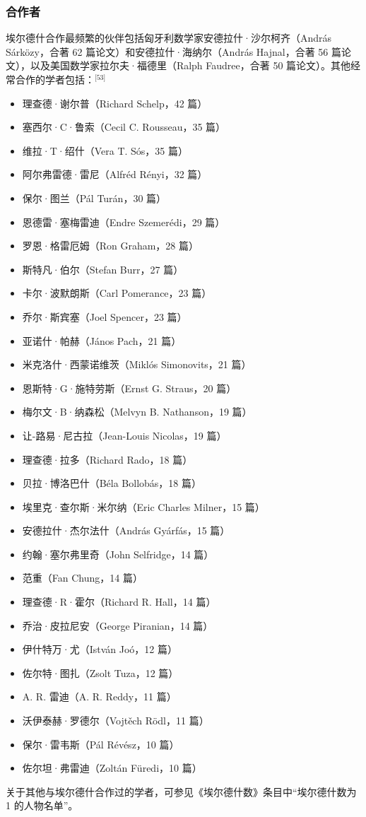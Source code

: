 \subsubsection{合作者}
埃尔德什合作最频繁的伙伴包括匈牙利数学家安德拉什·沙尔柯齐（András Sárközy，合著 62 篇论文）和安德拉什·海纳尔（András Hajnal，合著 56 篇论文），以及美国数学家拉尔夫·福德里（Ralph Faudree，合著 50 篇论文）。其他经常合作的学者包括：\(^\text{[53]}\)
\begin{itemize}
\item 理查德·谢尔普（Richard Schelp，42 篇）
\item 塞西尔·C·鲁索（Cecil C. Rousseau，35 篇）
\item 维拉·T·绍什（Vera T. Sós，35 篇）
\item 阿尔弗雷德·雷尼（Alfréd Rényi，32 篇）
\item 保尔·图兰（Pál Turán，30 篇）
\item 恩德雷·塞梅雷迪（Endre Szemerédi，29 篇）
\item 罗恩·格雷厄姆（Ron Graham，28 篇）
\item 斯特凡·伯尔（Stefan Burr，27 篇）
\item 卡尔·波默朗斯（Carl Pomerance，23 篇）
\item 乔尔·斯宾塞（Joel Spencer，23 篇）
\item 亚诺什·帕赫（János Pach，21 篇）
\item 米克洛什·西蒙诺维茨（Miklós Simonovits，21 篇）
\item 恩斯特·G·施特劳斯（Ernst G. Straus，20 篇）
\item 梅尔文·B·纳森松（Melvyn B. Nathanson，19 篇）
\item 让-路易·尼古拉（Jean-Louis Nicolas，19 篇）
\item 理查德·拉多（Richard Rado，18 篇）
\item 贝拉·博洛巴什（Béla Bollobás，18 篇）
\item 埃里克·查尔斯·米尔纳（Eric Charles Milner，15 篇）
\item 安德拉什·杰尔法什（András Gyárfás，15 篇）
\item 约翰·塞尔弗里奇（John Selfridge，14 篇）
\item 范重（Fan Chung，14 篇）
\item 理查德·R·霍尔（Richard R. Hall，14 篇）
\item 乔治·皮拉尼安（George Piranian，14 篇）
\item 伊什特万·尤（István Joó，12 篇）
\item 佐尔特·图扎（Zsolt Tuza，12 篇）
\item A. R. 雷迪（A. R. Reddy，11 篇）
\item 沃伊泰赫·罗德尔（Vojtěch Rödl，11 篇）
\item 保尔·雷韦斯（Pál Révész，10 篇）
\item 佐尔坦·弗雷迪（Zoltán Füredi，10 篇）
\end{itemize}
关于其他与埃尔德什合作过的学者，可参见《埃尔德什数》条目中“埃尔德什数为 1 的人物名单”。
